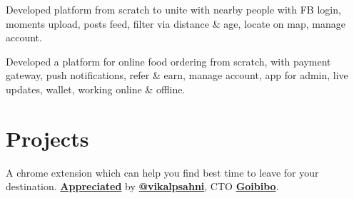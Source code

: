 \documentclass[a4paper]{deedy-resume} %
\begin{document}
\begin{minipage}[t]{0.66\textwidth}
    \sectionspace %
    
    
    
    Developed platform from scratch to unite with nearby people with FB login, moments upload, posts feed, filter via distance \& age, locate on map, manage account.
    
    \sectionspace %
    
    
    
    Developed a platform for online food ordering from scratch, with payment gateway, push notifications, refer \& earn, manage account, app for admin, live updates, wallet, working online \& offline.
    
    \sectionspace %
    
    
    \section{Projects}
    
    
    A chrome extension which can help you find best time to leave for your destination. \href{https://twitter.com/vikalpsahni/status/1014346010200559617}{\bf Appreciated} by \href{https://twitter.com/vikalpsahni}{\bf @vikalpsahni}, CTO \href{https://goibibo.com}{\bf Goibibo}.
    
    \sectionspace %
    
    

\end{minipage}
\end{document}
